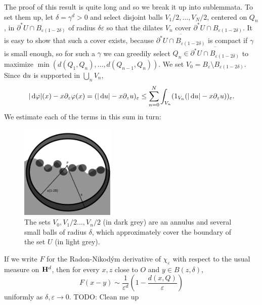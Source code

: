 The proof of this result is quite long and so we break it up into sublemmata.
To set them up, let $\delta = \gamma^d > 0$ and select disjoint balls $V_1/2, \dots, V_N/2$, centered on $Q_n$, in $\partial^* U \cap B_{\varepsilon(1 - 2\delta)}$ of radius $\delta\varepsilon$ so that the dilates $V_n$ cover $\partial^* U \cap B_{\varepsilon(1 - 2\delta)}$.
It is easy to show that such a cover exists, because $\overline{\partial^* U \cap B_{\varepsilon(1 - 2\delta)}}$ is compact if $\gamma$ is small enough, so for such a $\gamma$ we can greedily select $Q_n \in \overline{\partial^* U \cap B_{\varepsilon(1 - 2\delta)}}$ to maximize $\min(d(Q_1, Q_n), \dots, d(Q_{n - 1}, Q_n))$.
We set $V_0 = B_\varepsilon \setminus B_{\varepsilon(1 - 2\delta)}$.
Since $\mathop{}\!\mathrm{d} u$ is supported in $\bigcup_n V_n$,
$$|\mathop{}\!\mathrm{d} \varphi|(x) - x\partial_z \varphi(x) = (|\mathop{}\!\mathrm{d} u| - x\partial_zu)_\varepsilon \leq \sum_{n=0}^N \int_{V_n} (1_{V_n}(|\mathop{}\!\mathrm{d} u| - x\partial_zu))_\varepsilon.$$
We estimate each of the terms in this sum in turn:

\begin{figure}[ht]
\caption{The sets $V_0, V_1/2 \dots, V_n/2$ (in dark grey) are an annulus and several small balls of radius $\delta$, which approximately cover the boundary of the set $U$ (in light grey).}
\includegraphics[width=0.4\textwidth]{covering lemma}
\end{figure}


If we write $F$ for the Radon-Nikod\'ym derivative of $\chi_\varepsilon$ with respect to the usual measure on $\mathbf H^d$, then for every $x, z$ close to $O$ and $y \in B(z, \delta)$,
\begin{equation}\label{approximation of mollifier 2}
F(x - y) \sim \frac{1}{\varepsilon^d}\left(1 - \frac{d(x, Q)}{\varepsilon}\right)
\end{equation}
uniformly as $\delta, \varepsilon \to 0$. TODO: Clean me up

